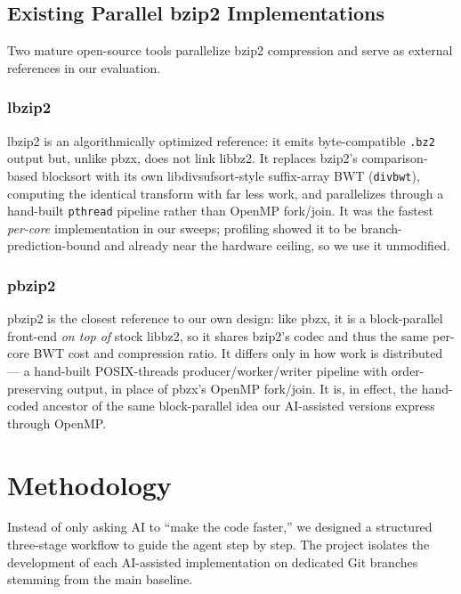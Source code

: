 \documentclass[conference]{IEEEtran}
\begin{document}
\subsection{Existing Parallel bzip2 Implementations}
Two mature open-source tools parallelize bzip2 compression and serve as external references in our evaluation.

\subsubsection{lbzip2}
lbzip2 is an algorithmically optimized reference: it emits byte-compatible \texttt{.bz2} output but, unlike pbzx, does not link libbz2. It replaces bzip2's comparison-based blocksort with its own libdivsufsort-style suffix-array BWT (\texttt{divbwt}), computing the identical transform with far less work, and parallelizes through a hand-built \texttt{pthread} pipeline rather than OpenMP fork/join. It was the fastest \emph{per-core} implementation in our sweeps; profiling showed it to be branch-prediction-bound and already near the hardware ceiling, so we use it unmodified.

\subsubsection{pbzip2}
pbzip2 is the closest reference to our own design: like pbzx, it is a block-parallel front-end \emph{on top of} stock libbz2, so it shares bzip2's codec and thus the same per-core BWT cost and compression ratio. It differs only in how work is distributed --- a hand-built POSIX-threads producer/worker/writer pipeline with order-preserving output, in place of pbzx's OpenMP fork/join. It is, in effect, the hand-coded ancestor of the same block-parallel idea our AI-assisted versions express through OpenMP.
\section{Methodology}
Instead of only asking AI to ``make the code faster,'' we designed a structured three-stage workflow to guide the agent step by step. The project isolates the development of each AI-assisted implementation on dedicated Git branches stemming from the main baseline.
\end{document}
